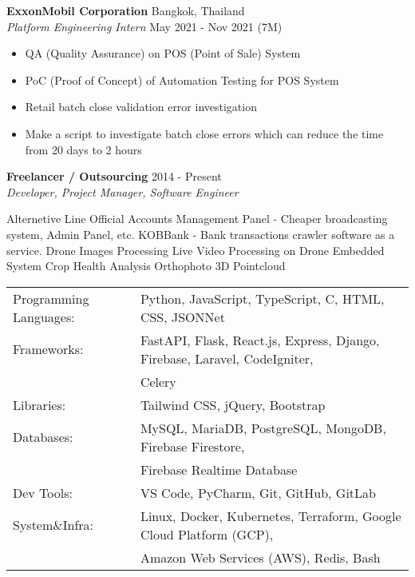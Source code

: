\vspace{-1mm}
\textbf{ExxonMobil Corporation} \hfill Bangkok, Thailand\\
\textit{Platform Engineering Intern} \hfill May 2021 - Nov 2021 (7M)\\
\vspace{-1mm}
\begin{itemize}
	\item QA (Quality Assurance) on POS (Point of Sale) System
	\item PoC (Proof of Concept) of Automation Testing for POS System
	\item Retail batch close validation error investigation
	\item Make a script to investigate batch close errors which can reduce the time from 20 days to 2 hours
\end{itemize}
\vspace{-1mm}
\textbf{Freelancer / Outsourcing} \hfill 2014 - Present\\
\textit{Developer, Project Manager, Software Engineer}\\
\vspace{-1mm}
\begin{outline}
	    \1 Alternetive Line Official Accounts Management Panel - Cheaper broadcasting system, Admin Panel, etc.
	    \1 KOBBank - Bank transactions crawler software as a service.
		\1 Drone Images Processing 
			\2 Live Video Processing on Drone Embedded System
			\2 Crop Health Analysis
			\2 Orthophoto
			\2 3D Pointcloud
\end{outline}
\vspace{2mm}

\pagebreak
\begin{tabular}{ l l }
	Programming Languages: & Python, JavaScript, TypeScript, C, HTML, CSS, JSONNet                         \\
	Frameworks:            & FastAPI, Flask, React.js, Express, Django, Firebase, Laravel, CodeIgniter,  \\ & Celery        \\
	Libraries:             & Tailwind CSS, jQuery, Bootstrap                                                          \\
	Databases:             & MySQL, MariaDB, PostgreSQL, MongoDB, Firebase Firestore, \\ & Firebase Realtime Database      \\
	Dev Tools:             & VS Code, PyCharm, Git, GitHub, GitLab                                                    \\
	System\&Infra:         & Linux, Docker, Kubernetes, Terraform, Google Cloud Platform (GCP), \\ & Amazon Web Services (AWS), Redis, Bash \\
\end{tabular}
\vspace{2mm}

